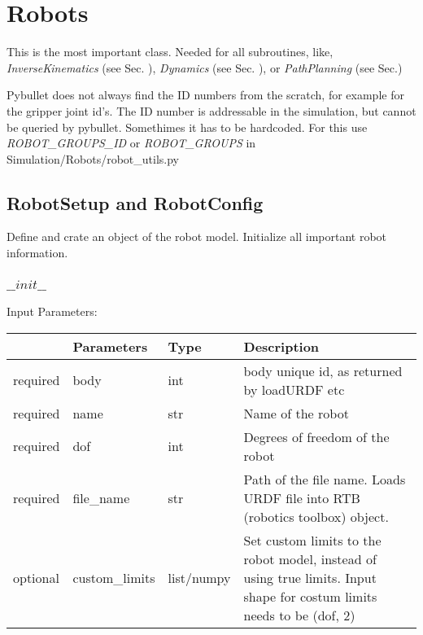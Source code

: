 \documentclass[
	ngerman,
	accentcolor=9c,%
	type=intern,
	marginpar=false
	]{tudapub}
\begin{document}
\newpage
\section{Robots}
\label{sec:robot}
\vspace{0.2cm}
\noindent This is the most important class. Needed for all subroutines, like, \textit{InverseKinematics} (see Sec. ), \textit{Dynamics} (see Sec. ), or \textit{PathPlanning} (see Sec.)


\vspace{0.2cm}
\noindent Pybullet does not always find the ID numbers from the scratch, for example for the gripper joint id's. The ID number is addressable in the simulation, but cannot be queried by pybullet. Somethimes it has to be hardcoded. For this use \textit{ROBOT\_GROUPS\_ID} or \textit{ROBOT\_GROUPS} in  Simulation/Robots/robot\_utils.py

\subsection{RobotSetup and RobotConfig}
\noindent Define and crate an object of the robot model. Initialize all important robot information.

\vspace{0.5cm}

\subsubsection{$\_\_init\_\_$}
\noindent Input Parameters:
\vspace{0.5cm}

\begin{tabular}{|p{}|p{}|p{}| p{}|}
\hline
 & \textbf{Parameters} & \textbf{Type} & \textbf{Description} \\
\hline
required & body & int & body unique id, as returned by loadURDF etc \\
\hline
required & name & str & Name of the robot \\
\hline
required & dof & int & Degrees of freedom of the robot \\
\hline
required & file\_name & str & Path of the file name. Loads URDF file into RTB (robotics toolbox) object.  \\
\hline
optional & custom\_limits & list/numpy & Set custom limits to the robot model, instead of using true limits.  Input shape for costum limits needs to be (dof, 2)\\
\hline
\end{tabular}
\vspace{0.5cm}
\end{document}

